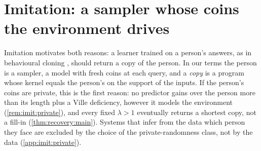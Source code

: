 \section{Imitation: a sampler whose coins the environment drives}\label{sec:imit}

Imitation motivates both reasons: a learner trained on a person's answers, as in behavioural cloning \citep{bain1999framework,dehaan2019causal}, should return a copy of the person. In our terms the person is a sampler, a model with fresh coins at each query, and a \emph{copy} is a program whose kernel equals the person's on the support of the inputs. If the person's coins are private, this is the first reason: no predictor gains over the person more than its length plus a Ville deficiency, however it models the environment (\cref{rem:imit:private}), and every fixed $\lambda>1$ eventually returns a shortest copy, not a fill-in (\cref{thm:recovery:main}). Systems that infer from the data which person they face are excluded by the choice of the private-randomness class, not by the data (\cref{app:imit:private}).

